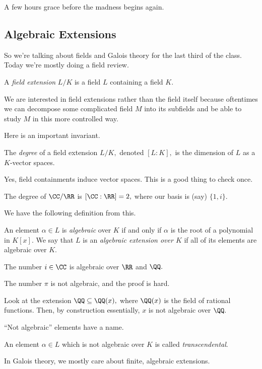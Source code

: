 

















A few hours grace before the madness begins again.

\subsection{Algebraic Extensions}
So we're talking about fields and Galois theory for the last third of the class. Today we're mostly doing a field review.
\begin{definition}
	A \textit{field extension} $L/K$ is a field $L$ containing a field $K.$
\end{definition}
We are interested in field extensions rather than the field itself because oftentimes we can decompose some complicated field $M$ into its subfields and be able to study $M$ in this more controlled way.

Here is an important invariant.
\begin{definition}[Degree]
	The \textit{degree} of a field extension $L/K,$ denoted $[L:K],$ is the dimension of $L$ as a $K$-vector spaces.
\end{definition}
\begin{remark}
	Yes, field containments induce vector spaces. This is a good thing to check once.
\end{remark}
\begin{example}
	The degree of $\CC/\RR$ is $[\CC:\RR]=2,$ where our basis is (say) $\{1,i\}.$
\end{example}
We have the following definition from this.
\begin{definition}[Algebraic]
	An element $\alpha\in L$ is \textit{algebraic} over $K$ if and only if $\alpha$ is the root of a polynomial in $K[x].$ We say that $L$ is an \textit{algebraic extension over $K$} if all of its elements are algebraic over $K.$
\end{definition}
\begin{example}
	The number $i\in\CC$ is algebraic over $\RR$ and $\QQ.$
\end{example}
\begin{nex}
	The number $\pi$ is not algebraic, and the proof is hard.
\end{nex}
\begin{nex}
	Look at the extension $\QQ\subseteq\QQ(x),$ where $\QQ(x)$ is the field of rational functions. Then, by construction essentially, $x$ is not algebraic over $\QQ.$
\end{nex}
``Not algebraic'' elements have a name.
\begin{definition}[Transcendental]
	An element $\alpha\in L$ which is not algebraic over $K$ is called \textit{transcendental}.
\end{definition}
In Galois theory, we mostly care about finite, algebraic extensions.

